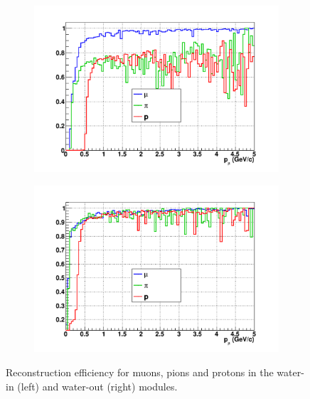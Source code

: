 \begin{figure}[htbp]
  \centering
    \begin{subfigure}{.49\textwidth}
      \includegraphics[width=\linewidth]{fig/EfficiencyParticles_Momentum.pdf}
    \end{subfigure}
    \begin{subfigure}{.49\textwidth}
      \includegraphics[width=\linewidth]{fig/EfficiencyParticles_Momentum_Empty.pdf}
    \end{subfigure}
  \caption{\label{fig:reconstructionefficiencyparticle_mometum} Reconstruction efficiency for muons, pions and protons in the water-in (left) and water-out (right) modules.}
\end{figure}
%
